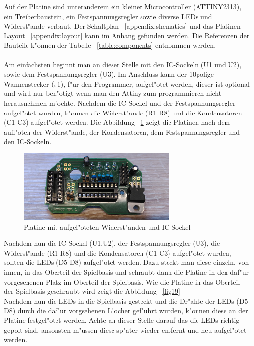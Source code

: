 Auf der Platine sind unteranderem ein kleiner Microcontroller (ATTINY2313), ein Treiberbaustein, ein Festspannungsregler sowie diverse LEDs und Widerst"ande verbaut. Der Schaltplan ~\ref{appendix:shematics} und das Platinen-Layout ~\ref{appendix:layout} kann im Anhang gefunden werden. Die Referenzen der Bauteile k"onnen der Tabelle ~\ref{table:components} entnommen werden.  \\
\\
Am einfachsten beginnt man an dieser Stelle mit den IC-Sockeln (U1 und U2), sowie dem Festspannungsregler (U3). Im Anschluss kann der 10polige Wannenstecker (J1), f"ur den Programmer, aufgel"otet werden, dieser ist optional und wird nur ben"otigt wenn man den Attiny zum programmieren nicht herausnehmen m"ochte.
Nachdem die IC-Sockel und der Festspannungsregler aufgel"otet wurden, k"onnen die Widerst"ande (R1-R8) und die Kondensatoren (C1-C3) aufgel"otet werden.
Die Abbildung ~\ref{fig18} zeigt die Platinen nach dem aufl"oten der Widerst"ande, der Kondensatoren, dem Festspannungsregler und den IC-Sockeln.

\vspace{1cm}
\begin{figure}[!ht]
	\centering
  	\includegraphics[width=0.7\textwidth]{pictures/loolou_018.jpg}
	\caption{Platine mit aufgel"oteten Widerst"anden und IC-Sockel}
	\label{fig18}
\end{figure}
\vspace{0.5cm}

Nachdem nun die IC-Sockel (U1,U2), der Festspannungsregler (U3), die Widerst"ande (R1-R8) und die Kondensatoren (C1-C3) aufgel"otet wurden, sollten die LEDs (D5-D8) aufgel"otet werden. Dazu steckt man diese einzeln, von innen, in das Oberteil der Spielbasis und schraubt dann die Platine in den daf"ur vorgesehenen Platz im Oberteil der Spielbasis. Wie die Platine in das Oberteil der Spielbasis geschraubt wird zeigt die Abbildung ~\ref{fig19} \\
Nachdem nun die LEDs in die Spielbasis gesteckt und die Dr"ahte der LEDs (D5-D8) durch die daf"ur vorgsehenen L"ocher gef"uhrt wurden, k"onnen diese an der Platine festgel"otet werden. Achte an dieser Stelle darauf das die LEDs richtig gepolt sind, ansonsten m"ussen diese sp"ater wieder entfernt und neu aufgel"otet werden.

